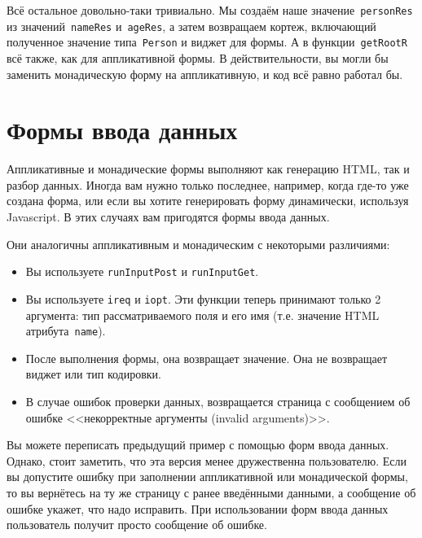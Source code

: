 Всё остальное довольно-таки тривиально. Мы создаём наше
значение~\lstinline'personRes' из значений~\lstinline'nameRes'
и~\lstinline'ageRes', а затем возвращаем кортеж, включающий полученное
значение типа~\lstinline'Person' и виджет для формы. А в
функции~\lstinline'getRootR' всё также, как для аппликативной формы. В
действительности, вы могли бы заменить монадическую форму на
аппликативную, и код всё равно работал бы.

\section{Формы ввода данных}
Аппликативные и монадические формы выполняют как генерацию HTML, так и разбор
данных.  Иногда вам нужно только последнее, например, когда где-то уже создана
форма, или если вы хотите генерировать форму динамически, используя
Javascript. В этих случаях вам пригодятся формы ввода данных.

Они аналогичны аппликативным и монадическим с некоторыми различиями:
\begin{itemize}
    \item Вы используете \lstinline'runInputPost' и \lstinline'runInputGet'.
    \item Вы используете \lstinline'ireq' и \lstinline'iopt'. Эти функции
        теперь принимают только 2 аргумента: тип рассматриваемого поля и его
        имя (т.е. значение HTML атрибута~\texttt{name}).
    \item После выполнения формы, она возвращает значение. Она не возвращает
        виджет или тип кодировки.
    \item В случае ошибок проверки данных, возвращается страница с сообщением
        об ошибке <<некорректные аргументы (invalid arguments)>>.
\end{itemize}
Вы можете переписать предыдущий пример с помощью форм ввода данных. Однако,
стоит заметить, что эта версия менее дружественна пользователю. Если вы
допустите ошибку при заполнении аппликативной или монадической формы, то вы
вернётесь на ту же страницу с ранее введёнными данными, а сообщение об ошибке
укажет, что надо исправить. При использовании форм ввода данных пользователь
получит просто сообщение об ошибке.


